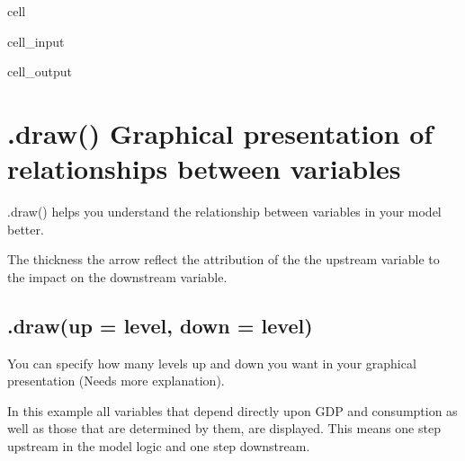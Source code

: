 \documentclass[letterpaper,10pt,english]{jupyterBook}
\begin{document}
\begin{sphinxuseclass}{cell}\begin{sphinxVerbatimInput}

\begin{sphinxuseclass}{cell_input}
\begin{sphinxVerbatim}[commandchars=\\\{\}]
\PYG{p}{[}\PYG{p}{]} 
\end{sphinxVerbatim}

\end{sphinxuseclass}\end{sphinxVerbatimInput}
\begin{sphinxVerbatimOutput}

\begin{sphinxuseclass}{cell_output}
\noindent{}

\end{sphinxuseclass}\end{sphinxVerbatimOutput}

\end{sphinxuseclass}

\section{.draw() Graphical presentation of relationships between variables}
\label{\detokenize{content/Python/modelflow_features:draw-graphical-presentation-of-relationships-between-variables}}
\sphinxAtStartPar
.draw() helps you understand the relationship between variables in your model better.

\sphinxAtStartPar
The thickness the arrow reflect the attribution of the the upstream variable to the impact on the downstream variable.


\subsection{.draw(up = level, down = level)}
\label{\detokenize{content/Python/modelflow_features:draw-up-level-down-level}}
\sphinxAtStartPar
You can specify how many levels up and down you want in your graphical presentation (Needs more explanation).

\sphinxAtStartPar
In this example all variables that depend directly upon GDP and consumption as well as those that are determined by them, are displayed. This means one step upstream in the model logic and one step downstream.
\end{document}

